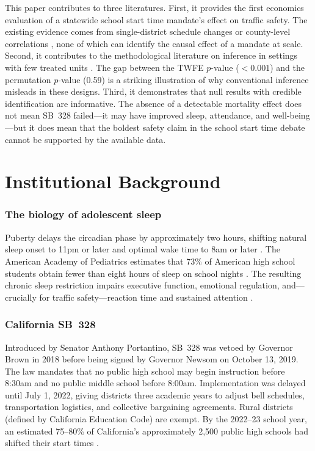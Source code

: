 \documentclass[12pt]{article}
\begin{document}
This paper contributes to three literatures. First, it provides the first economics evaluation of a statewide school start time mandate's effect on traffic safety. The existing evidence comes from single-district schedule changes \citep{carrell2011does, danner2008adolescent} or county-level correlations \citep{vorona2011dissimilar}, none of which can identify the causal effect of a mandate at scale. Second, it contributes to the methodological literature on inference in settings with few treated units \citep{abadie2010synthetic, conley2011inference, ferman2019inference, arkhangelsky2021synthetic}. The gap between the TWFE $p$-value ($< 0.001$) and the permutation $p$-value (0.59) is a striking illustration of why conventional inference misleads in these designs. Third, it demonstrates that null results with credible identification are informative. The absence of a detectable mortality effect does not mean SB~328 failed---it may have improved sleep, attendance, and well-being---but it does mean that the boldest safety claim in the school start time debate cannot be supported by the available data.

\section{Institutional Background}

\subsubsection*{The biology of adolescent sleep} Puberty delays the circadian phase by approximately two hours, shifting natural sleep onset to 11pm or later and optimal wake time to 8am or later \citep{carskadon2002adolescent, crowley2007sleep}. The American Academy of Pediatrics estimates that 73\% of American high school students obtain fewer than eight hours of sleep on school nights \citep{aap2014}. The resulting chronic sleep restriction impairs executive function, emotional regulation, and---crucially for traffic safety---reaction time and sustained attention \citep{owens2014insufficient}.

\subsubsection*{California SB~328} Introduced by Senator Anthony Portantino, SB~328 was vetoed by Governor Brown in 2018 before being signed by Governor Newsom on October 13, 2019. The law mandates that no public high school may begin instruction before 8:30am and no public middle school before 8:00am. Implementation was delayed until July 1, 2022, giving districts three academic years to adjust bell schedules, transportation logistics, and collective bargaining agreements. Rural districts (defined by California Education Code) are exempt. By the 2022--23 school year, an estimated 75--80\% of California's approximately 2,500 public high schools had shifted their start times \citep{rand2024implementation}.
\end{document}

